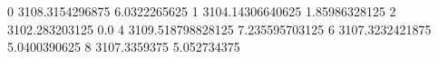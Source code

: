 0 3108.3154296875 6.0322265625
1 3104.14306640625 1.85986328125
2 3102.283203125 0.0
4 3109.518798828125 7.235595703125
6 3107.3232421875 5.0400390625
8 3107.3359375 5.052734375
